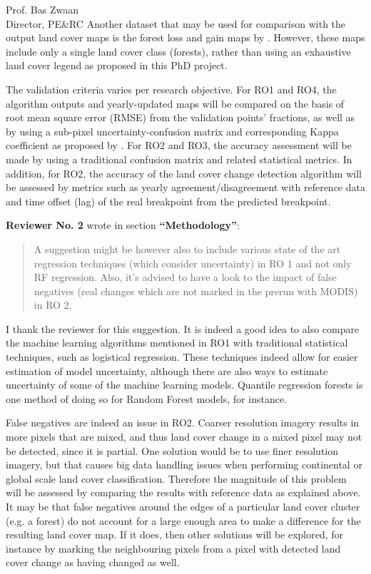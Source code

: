 \documentclass[a4paper,10pt,backaddress=false]{scrartcl}
\begin{document}
\begin{letter}{Prof. Bas Zwaan \\ Director, PE\&RC}
Another dataset that may be used for comparison with the output land cover maps is the forest loss and gain maps by \citet{hansen_high-resolution_2013}. However, these maps include only a single land cover class (forests), rather than using an exhaustive land cover legend as proposed in this PhD project.

The validation criteria varies per research objective. For RO1 and RO4, the algorithm outputs and yearly-updated maps will be compared on the basis of root mean square error (RMSE) from the validation points' fractions, as well as by using a sub-pixel uncertainty-confusion matrix and corresponding Kappa coefficient as proposed by \citet{silvan-cardenas_sub-pixel_2008}. For RO2 and RO3, the accuracy assessment will be made by using a traditional confusion matrix and related statistical metrics. In addition, for RO2, the accuracy of the land cover change detection algorithm will be assessed by metrics such as yearly agreement/disagreement with reference data and time offset (lag) of the real breakpoint from the predicted breakpoint.

\bigskip

\textbf{Reviewer No. 2} wrote in section \textbf{``Methodology''}:

\blockquote{A suggestion might be however also to include various state of the art regression techniques (which consider uncertainty) in RO 1 and not only RF regression. Also, it’s advised to have a look to the impact of false negatives (real changes which are not marked in the prerun with MODIS) in RO 2.}

I thank the reviewer for this suggestion. It is indeed a good idea to also compare the machine learning algorithms mentioned in RO1 with traditional statistical techniques, such as logistical regression. These techniques indeed allow for easier estimation of model uncertainty, although there are also ways to estimate uncertainty of some of the machine learning models. Quantile regression forests \citep{meinshausen_quantile_2006} is one method of doing so for Random Forest models, for instance.

False negatives are indeed an issue in RO2. Coarser resolution imagery results in more pixels that are mixed, and thus land cover change in a mixed pixel may not be detected, since it is partial. One solution would be to use finer resolution imagery, but that causes big data handling issues when performing continental or global scale land cover classification. Therefore the magnitude of this problem will be assessed by comparing the results with reference data as explained above. It may be that false negatives around the edges of a particular land cover cluster (e.g. a forest) do not account for a large enough area to make a difference for the resulting land cover map. If it does, then other solutions will be explored, for instance by marking the neighbouring pixels from a pixel with detected land cover change as having changed as well.


\end{letter}
\end{document}
